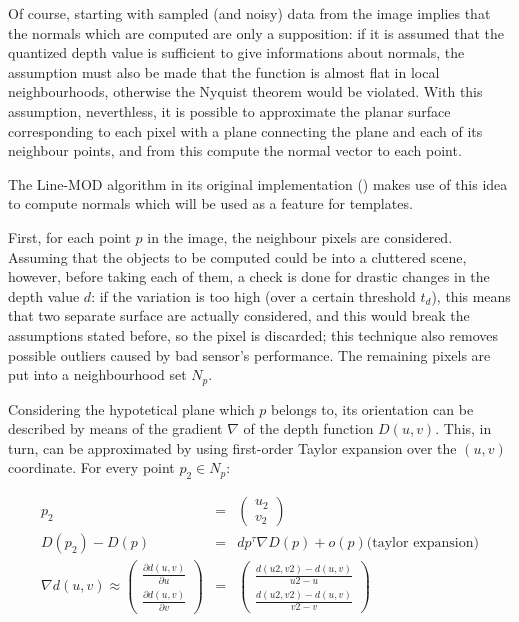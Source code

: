 Of course, starting with sampled (and noisy) data from the image
implies that the normals which are computed are only a supposition:
if it is assumed that the quantized depth value is sufficient to give
informations about normals, the assumption must also be made that the
function is almost flat in local neighbourhoods, otherwise the Nyquist
theorem would be violated. With this assumption, neverthless, it is
possible to approximate the planar surface corresponding to each pixel
with a plane connecting the plane and each of its neighbour points,
and from this compute the normal vector to each point.

The Line-MOD algorithm in its original implementation
(\cite{linemod-paper}) makes use of this idea to compute normals which will be used
as a feature for templates.

First, for each point $p$ in the image, the neighbour pixels are
considered. Assuming that the objects to be computed could be into a
cluttered scene, however, before taking each of them, a check is done
for drastic changes in the depth value $d$: if the variation is too
high (over a certain threshold $t_d$), this means that two separate
surface are actually considered, and this would break the assumptions
stated before, so the pixel is discarded; this technique also removes
possible outliers caused by bad sensor's performance.  The remaining pixels are put
into a neighbourhood set $N_p$. 

Considering the hypotetical plane which $p$ belongs to, its
orientation can be described by means of the gradient $\nabla$ of the
depth function $D(u,v)$. This, in turn, can be approximated by using first-order
Taylor expansion over the $(u,v)$ coordinate. For every point $p_2 \in N_p$:

\begin{eqnarray}
  p_2 & = & \begin{pmatrix} u_2 \\ v_2 
  \end{pmatrix} \\
  D(p_2)-D(p) & = & dp^{\tau}\nabla D (p) + o (p) \text{(taylor
    expansion)} \label{eqn:taylor-depth-expansion}\\
  \nabla d(u,v) \approx \begin{pmatrix} \frac{\partial d(u,v)}{\partial u}
    \\ \frac{\partial d(u,v)}{\partial v}
  \end{pmatrix} & = & \begin{pmatrix} \frac{d(u2,v2)-d(u,v)}{u2-u} \\
    \frac{d(u2,v2)-d(u,v)}{v2-v} 
  \end{pmatrix}
\end{eqnarray}

